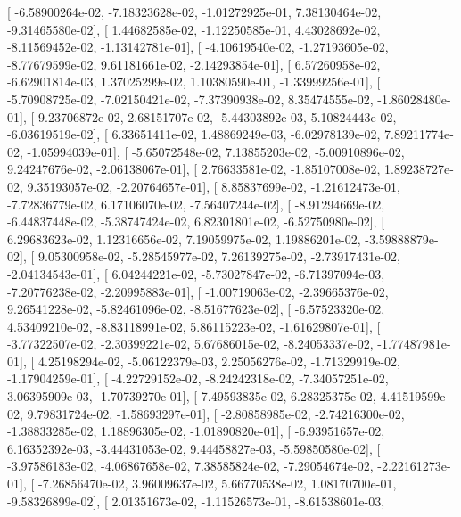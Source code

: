 \documentclass{article}
\begin{document}
       [ -6.58900264e-02,  -7.18323628e-02,  -1.01272925e-01,
          7.38130464e-02,  -9.31465580e-02],
       [  1.44682585e-02,  -1.12250585e-01,   4.43028692e-02,
         -8.11569452e-02,  -1.13142781e-01],
       [ -4.10619540e-02,  -1.27193605e-02,  -8.77679599e-02,
          9.61181661e-02,  -2.14293854e-01],
       [  6.57260958e-02,  -6.62901814e-03,   1.37025299e-02,
          1.10380590e-01,  -1.33999256e-01],
       [ -5.70908725e-02,  -7.02150421e-02,  -7.37390938e-02,
          8.35474555e-02,  -1.86028480e-01],
       [  9.23706872e-02,   2.68151707e-02,  -5.44303892e-03,
          5.10824443e-02,  -6.03619519e-02],
       [  6.33651411e-02,   1.48869249e-03,  -6.02978139e-02,
          7.89211774e-02,  -1.05994039e-01],
       [ -5.65072548e-02,   7.13855203e-02,  -5.00910896e-02,
          9.24247676e-02,  -2.06138067e-01],
       [  2.76633581e-02,  -1.85107008e-02,   1.89238727e-02,
          9.35193057e-02,  -2.20764657e-01],
       [  8.85837699e-02,  -1.21612473e-01,  -7.72836779e-02,
          6.17106070e-02,  -7.56407244e-02],
       [ -8.91294669e-02,  -6.44837448e-02,  -5.38747424e-02,
          6.82301801e-02,  -6.52750980e-02],
       [  6.29683623e-02,   1.12316656e-02,   7.19059975e-02,
          1.19886201e-02,  -3.59888879e-02],
       [  9.05300958e-02,  -5.28545977e-02,   7.26139275e-02,
         -2.73917431e-02,  -2.04134543e-01],
       [  6.04244221e-02,  -5.73027847e-02,  -6.71397094e-03,
         -7.20776238e-02,  -2.20995883e-01],
       [ -1.00719063e-02,  -2.39665376e-02,   9.26541228e-02,
         -5.82461096e-02,  -8.51677623e-02],
       [ -6.57523320e-02,   4.53409210e-02,  -8.83118991e-02,
          5.86115223e-02,  -1.61629807e-01],
       [ -3.77322507e-02,  -2.30399221e-02,   5.67686015e-02,
         -8.24053337e-02,  -1.77487981e-01],
       [  4.25198294e-02,  -5.06122379e-03,   2.25056276e-02,
         -1.71329919e-02,  -1.17904259e-01],
       [ -4.22729152e-02,  -8.24242318e-02,  -7.34057251e-02,
          3.06395909e-03,  -1.70739270e-01],
       [  7.49593835e-02,   6.28325375e-02,   4.41519599e-02,
          9.79831724e-02,  -1.58693297e-01],
       [ -2.80858985e-02,  -2.74216300e-02,  -1.38833285e-02,
          1.18896305e-02,  -1.01890820e-01],
       [ -6.93951657e-02,   6.16352392e-03,  -3.44431053e-02,
          9.44458827e-03,  -5.59850580e-02],
       [ -3.97586183e-02,  -4.06867658e-02,   7.38585824e-02,
         -7.29054674e-02,  -2.22161273e-01],
       [ -7.26856470e-02,   3.96009637e-02,   5.66770538e-02,
          1.08170700e-01,  -9.58326899e-02],
       [  2.01351673e-02,  -1.11526573e-01,  -8.61538601e-03,
\end{document}
